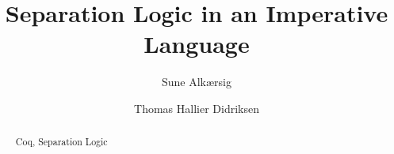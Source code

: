 \documentclass[oribibl]{llncs}
\newcommand{\keywords}[1]{\par\addvspace\baselineskip
\noindent\keywordname\enspace\ignorespaces#1}
\begin{document}

\mainmatter              %
\title{Separation Logic in an Imperative Language}

\author{Sune Alkærsig \and Thomas Hallier Didriksen\\
}



\maketitle              %

\begin{abstract}

\keywords{Coq, Separation Logic}
\end{abstract}










\end{document}
